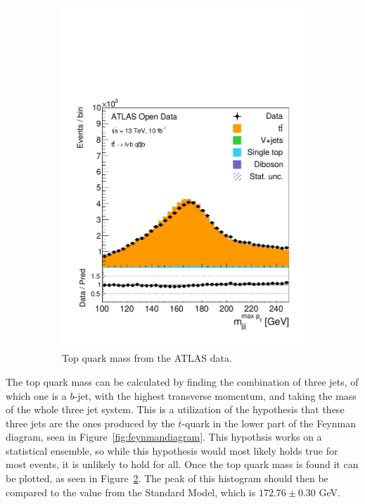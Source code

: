 \documentclass[12pt,a4paper]{article}
\numberwithin{equation}{section}
\begin{document}
\begin{figure}[t!]
\begin{subfigure}[t]{0.47\textwidth}
      \centering
      \includegraphics[width=1.0\textwidth]{figures/hist_Topmass}
      \caption{\label{fig:topmass}Top quark mass from the ATLAS data.}
    \end{subfigure}
    \caption{}
\end{figure}

The top quark mass can be calculated by finding the combination of three jets,
of which one is a $b$-jet, with the highest transverse momentum, and taking the
mass of the whole three jet system. This is a utilization of the hypothesis that
these three jets are the ones produced by the $\overline{t}$-quark in the lower
part of the Feynman diagram, seen in Figure~\ref{fig:feynmandiagram}. This
hypothsis works on a statistical ensemble, so while this hypothesis would most
likely holds true for most events, it is unlikely to hold for all.
Once the top quark mass is found it can be plotted, as seen in
Figure~\ref{fig:topmass}. The peak of this histogram should then be compared to
the value from the Standard Model, which is $172.76 \pm 0.30$ GeV\cite{pdg}.
\end{document}
